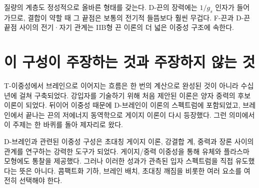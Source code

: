질량의 계층도 정성적으로 올바른 형태를 갖는다. D-끈의 장력에는 \(1/g_s\) 인자가 들어가므로, 결합이 약할 때 그 끝점은 보통의 전기적 들뜸보다 훨씬 무겁다. F-끈과 D-끈 끝점 사이의 전기·자기 관계는 IIB형 끈 이론의 더 넓은 이중성 구조에 속한다.

\begin{classroomqa}
\end{classroomqa}

\section{이 구성이 주장하는 것과 주장하지 않는 것}

T-이중성에서 브레인으로 이어지는 흐름은 한 번의 계산으로 완성된 것이 아니라 수십 년에 걸쳐 구축되었다. 강입자를 기술하기 위해 처음 제안된 이론은 양자 중력의 후보 이론이 되었다. 뒤이어 이중성 때문에 D-브레인이 이론의 스펙트럼에 포함되었고, 브레인에서 끝나는 끈의 저에너지 동역학으로 게이지 이론이 다시 등장했다. 그런 의미에서 이 주제는 한 바퀴를 돌아 제자리로 왔다.

D-브레인과 관련된 이중성 구성은 초대칭 게이지 이론, 강결합 계, 중력과 장론 사이의 관계를 연구하는 강력한 도구가 되었다. 게이지/중력 이중성을 통해 유체와 플라스마 모형에도 통찰을 제공했다. 그러나 이러한 성과가 관측된 입자 스펙트럼을 직접 유도했다는 뜻은 아니다. 콤팩트화 기하, 브레인 배치, 초대칭 깨짐을 비롯한 여러 요소를 여전히 선택해야 한다.

\begin{classroomqa}
\end{classroomqa}

\begin{classroomqa}
\end{classroomqa}

